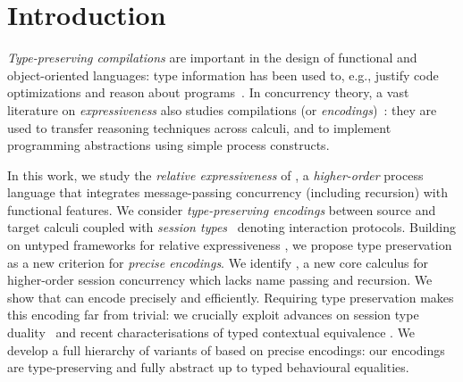 \documentclass[preprint,11pt]{elsarticle}
\begin{document}

\section{Introduction}
\label{sec:intro}
%


\emph{Type-preserving compilations} are important in the design of
functional and object-oriented languages: type information has been
used to, e.g., justify code optimizations and reason about programs~\cite{DBLP:journals/toplas/MorrisettWCG99,DBLP:conf/pldi/ShaoA95,DBLP:journals/toplas/LeagueST02}.
In concurrency theory, a vast literature on 
{\em expressiveness} 
also studies compilations (or \emph{encodings})~\cite{Palamidessi03,DBLP:journals/iandc/Gorla10,DBLP:journals/tcs/FuL10,DBLP:conf/icalp/LanesePSS10,DBLP:journals/corr/PetersG15}:
they are used to transfer reasoning techniques 
across calculi,
and to 
implement programming abstractions using simple process constructs.

In this work, we study 
the {\em relative expressiveness} 
 of \HOp, a \emph{higher-order} 
process language that integrates message-passing concurrency (including recursion) with functional features.
We consider 
\emph{type-preserving encodings} between 
source and target calculi coupled with \emph{session types}~\cite{honda.vasconcelos.kubo:language-primitives} denoting interaction protocols. 
Building on untyped frameworks for relative expressiveness
\cite{DBLP:journals/iandc/Gorla10}, 
we propose type preservation as a {new criterion} for \emph{precise encodings}.
We identify \HO, a new core calculus for higher-order session concurrency which lacks
name passing and recursion. 
We show that \HO can encode \HOp precisely and efficiently. 
Requiring  
type preservation makes
this encoding far from trivial: we crucially exploit advances on
session type duality~\cite{TGC14,DBLP:journals/corr/abs-1202-2086} and recent
characterisations of typed contextual equivalence \cite{characteristic_bis,KouzapasPY17}.
We develop a full hierarchy of variants of \HOp based on 
precise encodings: %
our encodings are
type-preserving and fully abstract up to typed
behavioural equalities. 
\end{document}
